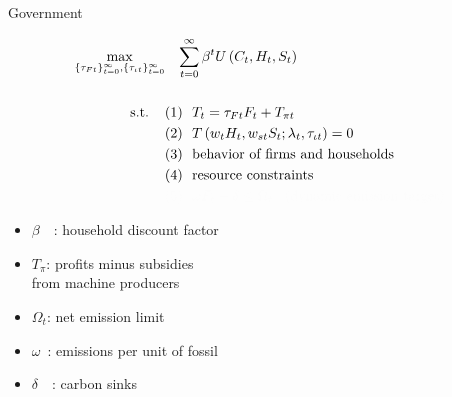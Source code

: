 \documentclass[11pt,aspectratio=169]{beamer}
\begin{document}
\begin{frame}{Government}
	\hypertarget{gov}{}
	\vspace{-4mm}
	\centering
	\begin{minipage}[t!]{1\textwidth}
		\begin{align*}
			\max_{\{\tau_{Ft}\}_{t=0}^{\infty}, \{\tau_{\iota t}\}_{t=0}^{\infty}}&\hspace{3mm} \sum_{t=0}^{\infty}\beta^t U\left(C_t,H_t, S_t\right)\\ \ \\
			\text{s.t.} \hspace{4mm}
			&{ (1)\ \ T_t={{\tau_{Ft}}}F_{t}}+T_{\pi t}\\
			&{(2)\ \ T\left(w_{t}H_{t},w_{st}S_{t}; \lambda_t, \tau_{\iota t}\right)=0}\\
			& {(3)\ \  \text{behavior of firms and households}}\\
			& {(4)\ \ \text{resource constraints} }\\
			& \textcolor{black!1}{(5)\ \  {\omega F_t-\delta \leq\Omega_t } \hspace{3mm} {\text{(dynamic emission target)}}}
		\end{align*}
	\end{minipage}
	
	\small
	\vspace{-4mm}
	\hspace{-10mm}
	\begin{minipage}[t!]{0.5\textwidth}
		\vspace{7mm}
		\begin{itemize}
			\item[] $\beta$\ \ : household discount factor\vspace{-2mm}
			\item[] $T_\pi$: profits minus subsidies \\ \hspace{5.5mm} from machine producers \vspace{0mm}
		\end{itemize}
	\end{minipage}
\begin{minipage}[t!]{0.45\textwidth}
	\vspace{8mm}
	\begin{itemize}
		\item[] \textcolor{black!1}{$\Omega_{t}$: net emission limit}
		\vspace{-2mm}	
		\item[] \textcolor{black!1}{$\omega$\ : emissions per unit of fossil} \vspace{-0.8mm}
		\item[] \textcolor{black!1}{$\delta$\ \ : carbon sinks \tiny{\citep{VanVuuren2018AlternativeTechnologies}}}
	\end{itemize}
	\end{minipage}
\end{frame}
\end{document}
